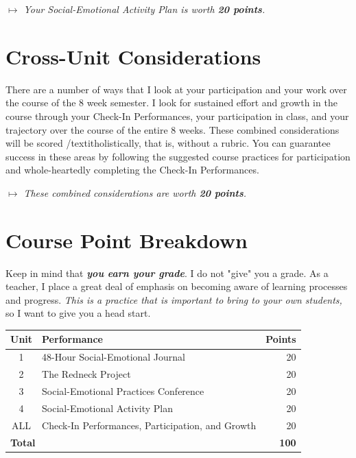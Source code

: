 \documentclass[two-side]{tufte-handout}
\begin{document}
\medskip\noindent\textit{$\mapsto$ Your Social-Emotional Activity Plan is worth \textbf{20 points}.}

\section{Cross-Unit Considerations}

There are a number of ways that I look at your participation and your work over the course of the 8 week semester. I look for sustained effort and growth in the course through your Check-In Performances, your participation in class, and your trajectory over the course of the entire 8 weeks. These combined considerations will be scored /textit{holistically}, that is, without a rubric. You can guarantee success in these areas by following the suggested course practices for participation and whole-heartedly completing the Check-In Performances.

\medskip\noindent\textit{$\mapsto$ These combined considerations are worth \textbf{20 points}.}

\section{Course Point Breakdown}

Keep in mind that \emph{\textbf{you earn your grade}}. I do not "give" you a grade. As a teacher, I place a great deal of emphasis on becoming aware of learning processes and progress. \emph{This is a practice that is important to bring to your own students,} so I want to give you a head start.

\bigskip

\begin{tabular}{clr}
	\toprule
	Unit & Performance & Points \\
	\midrule\midrule
	1 & 48-Hour Social-Emotional Journal & 20 \\
	\midrule
	2 & The Redneck Project & 20 \\
	\midrule
	3 & Social-Emotional Practices Conference & 20 \\
	\midrule
	4 & Social-Emotional Activity Plan & 20 \\
	\midrule
	ALL & Check-In Performances, Participation, and Growth & 20 \\
	\midrule\midrule
	\multicolumn{2}{l}{\textbf{Total}} & \textbf{100} \\
	\bottomrule
\end{tabular}
\end{document}
